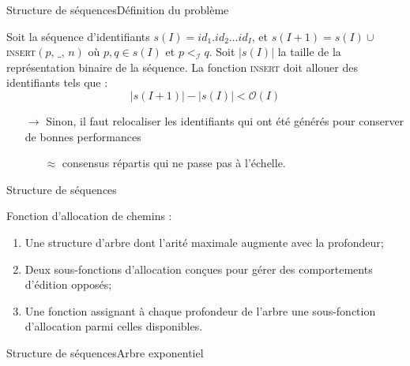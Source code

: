 \begin{frame}{Structure de séquences}{Définition du problème}

  \begin{problem}
    Soit la séquence d'identifiants $s(I)= id_1.id_2\ldots id_I$, et
    $s(I+1) = s(I) \cup $\textsc{insert}$(p,\, \_,\, n)$ où $p,q \in s(I)$ et
    $p<_\mathcal{I}q$. Soit $|s(I)|$ la taille de la représentation binaire de la
    séquence. La fonction \textsc{insert} doit allouer des identifiants tels que :
    \begin{equation}
      |s(I+1)| - |s(I)| < \mathcal{O}(I)
    \end{equation}
  \end{problem}
  
  \vspace{0.5cm}

  \begin{itemize}
  \item [$\rightarrow$] Sinon, il faut relocaliser les identifiants qui ont été
    générés pour conserver de bonnes performances
    \begin{itemize}
    \item [$\approx$] consensus répartis qui ne passe pas à l'échelle.
    \end{itemize}
  \end{itemize}

\end{frame}


\begin{frame}{Structure de séquences}{\LSEQ}
  
  Fonction d'allocation de chemins :
  \begin{enumerate}
  \item Une structure d'arbre dont l'arité maximale augmente avec la profondeur;
  \item Deux sous-fonctions d'allocation conçues pour gérer des comportements
    d'édition opposés;
  \item Une fonction assignant à chaque profondeur de l'arbre une sous-fonction
    d'allocation parmi celles disponibles.
  \end{enumerate}
  
\end{frame}


\begin{frame}{Structure de séquences}{Arbre exponentiel}

  \begin{center}
    
  \end{center}

\end{frame}


